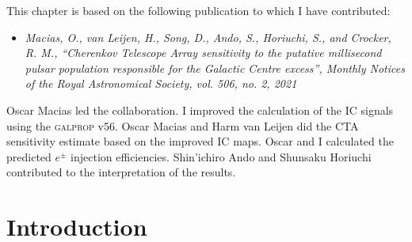 \documentclass[doublespace,nopageskip]{VTthesis} %
\begin{document}
This chapter is based on the following publication to which I have contributed:
\begin{itemize}
    \item \emph{Macias, O., van Leijen, H., Song, D., Ando, S., Horiuchi, S., and Crocker, R. M., “Cherenkov Telescope Array sensitivity to the putative millisecond pulsar population responsible for the Galactic Centre excess”, Monthly Notices of the Royal Astronomical Society, vol. 506, no. 2, 2021}
\end{itemize}
Oscar Macias led the collaboration. I improved the calculation of the IC signals using the \textsc{galprop} v56. Oscar Macias and Harm van Leijen did the CTA sensitivity estimate based on the improved IC maps. Oscar and I calculated the predicted $e^\pm$ injection efficiencies. Shin'ichiro Ando and Shunsaku Horiuchi contributed to the interpretation of the results.


\section{Introduction}
\label{sec:introduction}
\end{document}
